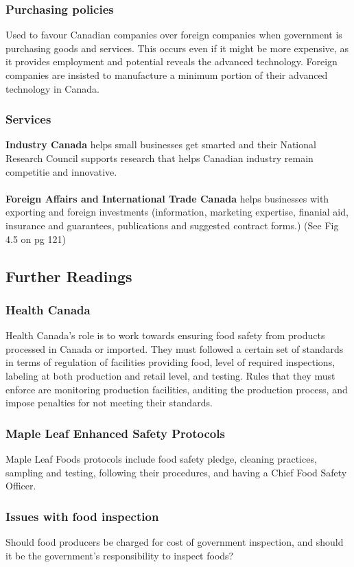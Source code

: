 \documentclass[english, 12pt]{article}
\begin{document}
\subsubsection{Purchasing policies}
Used to favour Canadian companies over foreign companies when government is purchasing goods and services. This occurs even if it might be more expensive, as it provides employment and potential reveals the advanced technology. Foreign companies are insisted to manufacture a minimum portion of their advanced technology in Canada.
\subsubsection{Services}
\textbf{Industry Canada} helps small businesses get smarted and their National Research Council supports research that helps Canadian industry remain competitie and innovative.\\\\
\textbf{Foreign Affairs and International Trade Canada} helps businesses with exporting and foreign investments (information, marketing expertise, finanial aid, insurance and guarantees, publications and suggested contract forms.) (See Fig 4.5 on pg 121)
\subsection*{Further Readings}
\subsubsection*{Health Canada}
Health Canada's role is to work towards ensuring food safety from products processed in Canada or imported. They must followed a certain set of standards in terms of regulation of facilities providing food, level of required inspections, labeling at both production and retail level, and testing. Rules that they must enforce are monitoring production facilities, auditing the production process, and impose penalties for not meeting their standards.
\subsubsection*{Maple Leaf Enhanced Safety Protocols}
Maple Leaf Foods protocols include food safety pledge, cleaning practices, sampling and testing, following their procedures, and having a Chief Food Safety Officer.
\subsubsection*{Issues with food inspection}
Should food producers be charged for cost of government inspection, and should it be the government's responsibility to inspect foods?
\end{document}
